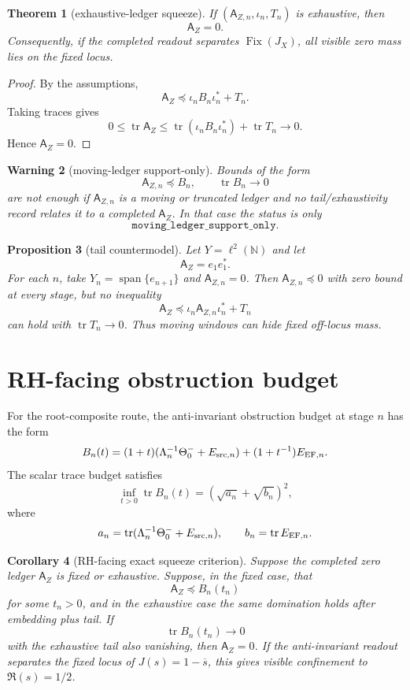 \documentclass[11pt]{article}
\newtheorem{theorem}{Theorem}[section]
\newtheorem{proposition}[theorem]{Proposition}
\newtheorem{corollary}[theorem]{Corollary}
\newtheorem{warning}[theorem]{Warning}
\newcommand{\Tr}{\operatorname{tr}}
\newcommand{\Fix}{\operatorname{Fix}}
\newcommand{\spanop}{\operatorname{span}}
\begin{document}
\begin{theorem}[exhaustive-ledger squeeze]
If $(\mathsf A_{Z,n},\iota_n,T_n)$ is exhaustive, then
\[
        \mathsf A_Z=0.
\]
Consequently, if the completed readout separates $\Fix(J_X)$, all visible zero mass lies on the fixed locus.
\end{theorem}

\begin{proof}
By the assumptions,
\[
        \mathsf A_Z
        \preceq \iota_n B_n\iota_n^*+T_n.
\]
Taking traces gives
\[
        0\le\Tr\mathsf A_Z
        \le \Tr(\iota_nB_n\iota_n^*)+\Tr T_n\to0.
\]
Hence $\mathsf A_Z=0$.
\end{proof}

\begin{warning}[moving-ledger support-only]
Bounds of the form
\[
        \mathsf A_{Z,n}\preceq B_n,
        \qquad \Tr B_n\to0
\]
are not enough if $\mathsf A_{Z,n}$ is a moving or truncated ledger and no tail/exhaustivity record relates it to a completed $\mathsf A_Z$.  In that case the status is only
\[
        \texttt{moving\_ledger\_support\_only}.
\]
\end{warning}

\begin{proposition}[tail countermodel]
Let $Y=\ell^2(\mathbb N)$ and let
\[
        \mathsf A_Z=e_1e_1^*.
\]
For each $n$, take $Y_n=\spanop\{e_{n+1}\}$ and $\mathsf A_{Z,n}=0$. Then $\mathsf A_{Z,n}\preceq0$ with zero bound at every stage, but no inequality
\[
        \mathsf A_Z\preceq \iota_n\mathsf A_{Z,n}\iota_n^*+T_n
\]
can hold with $\Tr T_n\to0$.  Thus moving windows can hide fixed off-locus mass.
\end{proposition}

\section{RH-facing obstruction budget}

For the root-composite route, the anti-invariant obstruction budget at stage $n$ has the form
\[
        B_n(t)=
        (1+t)(\Lambda_n^{-1}\Theta_0^-+E_{{\rm src},n})
        +(1+t^{-1})E_{{\rm EF},n}.
\]
The scalar trace budget satisfies
\[
        \inf_{t>0}\Tr B_n(t)
        =\left(\sqrt{a_n}+\sqrt{b_n}\right)^2,
\]
where
\[
        a_n=\Tr(\Lambda_n^{-1}\Theta_0^-+E_{{\rm src},n}),
        \qquad
        b_n=\Tr E_{{\rm EF},n}.
\]

\begin{corollary}[RH-facing exact squeeze criterion]
Suppose the completed zero ledger $\mathsf A_Z$ is fixed or exhaustive. Suppose, in the fixed case, that
\[
        \mathsf A_Z\preceq B_n(t_n)
\]
for some $t_n>0$, and in the exhaustive case the same domination holds after embedding plus tail. If
\[
        \Tr B_n(t_n)\to0
\]
with the exhaustive tail also vanishing, then $\mathsf A_Z=0$.  If the anti-invariant readout separates the fixed locus of $J(s)=1-\overline{s}$, this gives visible confinement to $\Re(s)=1/2$.
\end{corollary}
\end{document}
